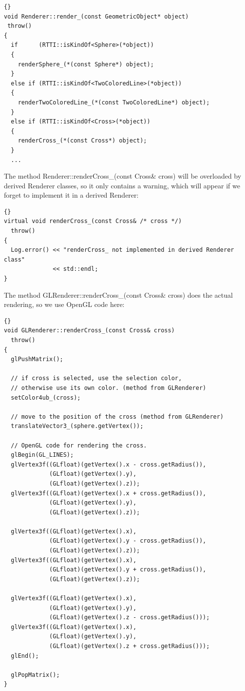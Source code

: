 \begin{lstlisting}{}
void Renderer::render_(const GeometricObject* object)
 throw()
{
  if      (RTTI::isKindOf<Sphere>(*object))         
  { 
    renderSphere_(*(const Sphere*) object);
  }
  else if (RTTI::isKindOf<TwoColoredLine>(*object)) 
  { 
    renderTwoColoredLine_(*(const TwoColoredLine*) object);
  }
  else if (RTTI::isKindOf<Cross>(*object))          
  { 
    renderCross_(*(const Cross*) object);
  }
  ...
\end{lstlisting}

The method Renderer::renderCross\_(const Cross\& cross)
will be overloaded by derived Renderer classes, so it only
contains a warning, which will appear if we forget to 
implement it in a derived Renderer:

\begin{lstlisting}{}
virtual void renderCross_(const Cross& /* cross */)
  throw() 
{
  Log.error() << "renderCross_ not implemented in derived Renderer class"
              << std::endl;
}
\end{lstlisting}


The method GLRenderer::renderCross\_(const Cross\& cross)
does the actual rendering, so we use OpenGL code here:

\begin{lstlisting}{}
void GLRenderer::renderCross_(const Cross& cross)
  throw() 
{
  glPushMatrix();
	
  // if cross is selected, use the selection color,
  // otherwise use its own color. (method from GLRenderer)
  setColor4ub_(cross);  
	
  // move to the position of the cross (method from GLRenderer)
  translateVector3_(sphere.getVertex());
	
  // OpenGL code for rendering the cross.
  glBegin(GL_LINES);
  glVertex3f((GLfloat)(getVertex().x - cross.getRadius()),
             (GLfloat)(getVertex().y),
             (GLfloat)(getVertex().z));
  glVertex3f((GLfloat)(getVertex().x + cross.getRadius()),
             (GLfloat)(getVertex().y),
             (GLfloat)(getVertex().z));

  glVertex3f((GLfloat)(getVertex().x),
             (GLfloat)(getVertex().y - cross.getRadius()),
             (GLfloat)(getVertex().z));
  glVertex3f((GLfloat)(getVertex().x),
             (GLfloat)(getVertex().y + cross.getRadius()),
             (GLfloat)(getVertex().z));

  glVertex3f((GLfloat)(getVertex().x),
             (GLfloat)(getVertex().y),
             (GLfloat)(getVertex().z - cross.getRadius()));
  glVertex3f((GLfloat)(getVertex().x),
             (GLfloat)(getVertex().y),
             (GLfloat)(getVertex().z + cross.getRadius()));
  glEnd();

  glPopMatrix();
}
\end{lstlisting}


